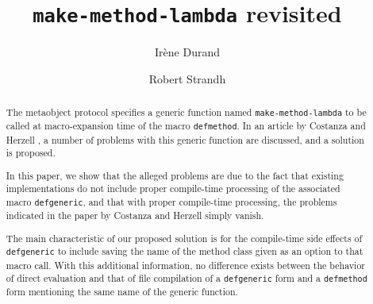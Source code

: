 \documentclass[format=sigconf]{acmart}
\begin{document}

\title{\texttt{make-method-lambda} revisited}

\author{Irène Durand}

\author{Robert Strandh}






\begin{abstract}
The \commonlisp{} metaobject protocol specifies a generic function
named \texttt{make-method-lambda} to be called at macro-expansion time
of the macro \texttt{defmethod}.  In an article by Costanza and
Herzell \cite{Constanza:2008}, a number of problems with this generic
function are discussed, and a solution is proposed.

In this paper, we show that the alleged problems are due to the fact
that existing implementations do not include proper compile-time
processing of the associated macro \texttt{defgeneric}, and that with
proper compile-time processing, the problems indicated in the paper by
Costanza and Herzell simply vanish.

The main characteristic of our proposed solution is for the
compile-time side effects of \texttt{defgeneric} to include saving the
name of the method class given as an option to that macro call.  With
this additional information, no difference exists between the behavior
of direct evaluation and that of file compilation of a
\texttt{defgeneric} form and a \texttt{defmethod} form mentioning the
same name of the generic function.
\end{abstract}
\end{document}
